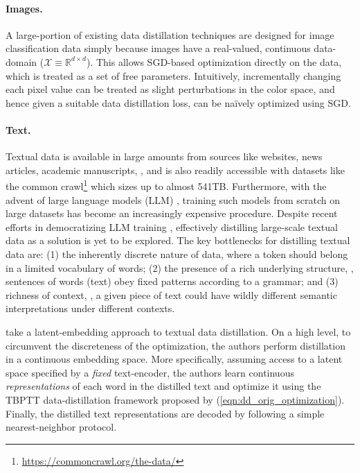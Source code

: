 \documentclass[10pt]{article} %
\begin{document}
\paragraph{Images.} A large-portion of existing data distillation techniques are designed for image classification data \citep{dd_orig, zhao_dc, zhao_dsa, kip, kip_conv, dm, idc, mtt, cafe, gan_distillation, frepo, rfad, dcc, haba, remember_past, kfs} simply because images have a real-valued, continuous data-domain ($\mathcal{X} \equiv \mathbb{R}^{d \times d}$). This allows SGD-based optimization directly on the data, which is treated as a set of free parameters. Intuitively, incrementally changing each pixel value can be treated as slight perturbations in the color space, and hence given a suitable data distillation loss, can be na\"ively optimized using SGD. 

\paragraph{Text.} Textual data is available in large amounts from sources like websites, news articles, academic manuscripts, \etc, and is also readily accessible with datasets like the common crawl\footnote{\href{https://commoncrawl.org/the-data/}{https://commoncrawl.org/the-data/}} which sizes up to almost 541TB. Furthermore, with the advent of large language models (LLM) \citep{bert, gpt, lamda}, training such models from scratch on large datasets has become an increasingly expensive procedure. Despite recent efforts in democratizing LLM training \citep{cramming, huggingface, bloom}, effectively distilling large-scale textual data as a solution is yet to be explored. The key bottlenecks for distilling textual data are: (1) the inherently discrete nature of data, where a token should belong in a limited vocabulary of words; (2) the presence of a rich underlying structure, \ie, sentences of words (text) obey fixed patterns according to a grammar; and (3) richness of context, \ie, a given piece of text could have wildly different semantic interpretations under different contexts.

\citet{text_distill} take a latent-embedding approach to textual data distillation. On a high level, to circumvent the discreteness of the optimization, the authors perform distillation in a continuous embedding space. More specifically, assuming access to a latent space specified by a \emph{fixed} text-encoder, the authors learn continuous \emph{representations} of each word in the distilled text and optimize it using the TBPTT data-distillation framework proposed by \citet{dd_orig} (\cref{eqn:dd_orig_optimization}). Finally, the distilled text representations are decoded by following a simple nearest-neighbor protocol.
\end{document}
